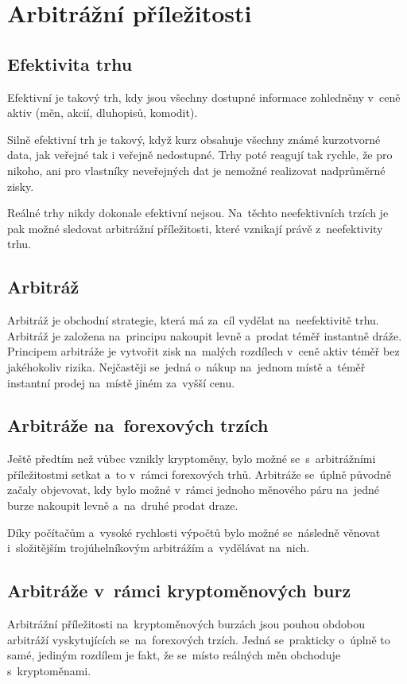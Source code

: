 \documentclass[thesis=B,czech]{FITthesis}[2019/03/21]
\begin{document}
\section{Arbitrážní příležitosti}
\subsection{Efektivita trhu}
Efektivní je takový trh, kdy jsou všechny dostupné informace zohledněny v~ceně aktiv (měn, akcií, dluhopisů, komodit).\cite{efektivita_trhu}

Silně efektivní trh je takový, když kurz obsahuje všechny známé kurzotvorné data, jak veřejné tak i veřejně nedostupné. Trhy poté reagují tak rychle, že pro nikoho, ani pro vlastníky neveřejných dat je nemožné realizovat nadprůměrné zisky. \cite{efektivnost_trhu}

Reálné trhy nikdy dokonale efektivní nejsou. Na~těchto neefektivních trzích je pak možné sledovat arbitrážní příležitosti, které vznikají právě z~neefektivity trhu. \cite{what_is_arbitage} \cite{pecev}

\subsection{Arbitráž}
Arbitráž je obchodní strategie, která má za~cíl vydělat na~neefektivitě trhu. Arbitráž je založena na~principu nakoupit levně a~prodat téměř instantně dráže. Principem arbitráže je vytvořit zisk na~malých rozdílech v~ceně aktiv téměř bez jakéhokoliv rizika. Nejčastěji se~jedná o~nákup na~jednom místě a~téměř instantní prodej na~místě jiném za~vyšší cenu. \cite{Capital}

\subsection{Arbitráže na~forexových trzích}
Ještě předtím než vůbec vznikly kryptoměny, bylo možné se~s~arbitrážními příležitostmi setkat a~to v~rámci forexových trhů. Arbitráže se~úplně původně začaly objevovat, kdy bylo možné v~rámci jednoho měnového páru na~jedné burze nakoupit levně a~na~druhé prodat draze. 

Díky počítačům a~vysoké rychlosti výpočtů bylo možné se~následně věnovat i~složitějším trojúhelníkovým arbitrážím a~vydělávat na~nich. \cite{investopedia_forex_arbitrage}

\subsection{Arbitráže v~rámci kryptoměnových burz}
Arbitrážní příležitosti na~kryptoměnových burzách jsou pouhou obdobou arbitráží vyskytujících se~na~forexových trzích. Jedná se~prakticky o~úplně to samé, jediným rozdílem je fakt, že se~místo reálných měn obchoduje s~kryptoměnami. 
\end{document}
